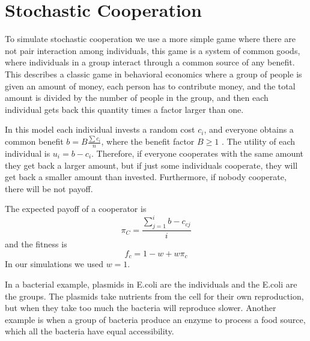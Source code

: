 \chapter{Stochastic Cooperation}
\ifpdf
    \graphicspath{{StochasticCooperation/Figs/PNG/}{StochasticCooperation/Figs/PDF/}{StochasticCooperation/Figs/}}
\else
    \graphicspath{{StochasticCooperation/Figs/EPS/}{StochasticCooperation/Figs/}}
\fi
To simulate stochastic cooperation we use a more simple game where there are not pair interaction among individuals, this game is a system of common goods, where individuals in a group interact through a common source of any benefit.  This describes a classic game in behavioral economics\cite{Szabo2002} where a  group of people is given an amount of money, each person has to contribute money, and the total amount is divided by the number of people in the group, and then each individual gets back this quantity times a factor larger than one.

 In this model  each individual invests a random cost $c_{i}$, and everyone obtains a common benefit $b=B\frac{\sum c_{i}}{n}$, where the benefit factor $B\geqslant1$ . The utility of each individual is $u_{i}=b-c_{i}$. Therefore, if everyone cooperates with the same amount they get back a larger amount, but if just some individuals cooperate, they will get back a smaller amount than invested. Furthermore, if nobody cooperate, there will be not payoff. 
 
 The expected payoff of a cooperator is
   \begin{equation}
   \pi_{C}=\frac{\sum_{j=1}^{i}b-c_{cj}}{i}
   \end{equation}   
   and the fitness is
   \begin{equation}
   f_{c}=1-w+w\pi_{c}
   \end{equation} 
   In our simulations we used $w=1$.

 
    In a bacterial example, plasmids in E.coli are the individuals and the E.coli are the groups. The plasmids take nutrients from the cell for their own reproduction, but when they take too much the bacteria will reproduce slower. 
    Another example is when a group of bacteria produce  an enzyme to process a food source, which all the bacteria have equal accessibility.  
    
